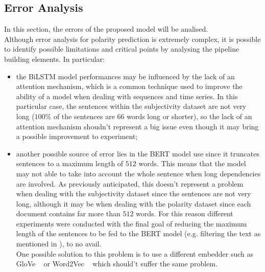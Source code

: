 \subsection{Error Analysis}
\label{subsec:err}
In this section, the errors of the proposed model will be analised.\\
Although error analysis for polarity prediction is extremely complex, it is possible to identify possible limitations and critical points by analysing the pipeline building 
elements. In particular:
\begin{itemize}

    \item the BiLSTM model performances may be influenced by the lack of an attention mechanism, which is a common technique used to improve the ability of a model when 
        dealing with sequences and time series. In this particular case, the sentences within the subjectivity dataset are not very long ($100\%$ of the sentences are 
        $66$ words long or shorter), so the lack of an attention mechanism shoudn't represent a big issue even though it may bring a possible improvement to experiment;

    \item another possible source of error lies in the BERT model use since it truncates sentences to a maximum length of $512$ words.
        This means that the model may not able to take into account the whole sentence when long dependencies are involved. 
        As previously anticipated, this doesn't represent a problem when dealing with the subjectivity dataset since the sentences are not very long, 
        although it may be when dealing with the polarity dataset since each document contains far more than $512$ words.
        For this reason different experiments were conducted with the final goal of reducing the maximum length of the sentences to be fed to the BERT model
        (e.g. filtering the text as mentioned in ), to no avail. \\
        One possible solution to this problem is to use a different embedder such as GloVe ~\cite{glove} or Word2Vec ~\cite{word2vec} which should't suffer the same problem.

\end{itemize}

